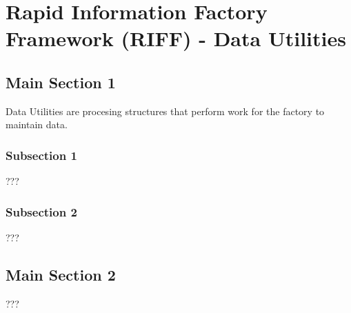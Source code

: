 
\chapter{Rapid Information Factory Framework (RIFF) - Data Utilities} %

\label{Chapter39} %



\section{Main Section 1}

Data Utilities are procesing structures that perform work for the factory to maintain data.

\subsection{Subsection 1}

???


\subsection{Subsection 2}

???


\section{Main Section 2}

???
